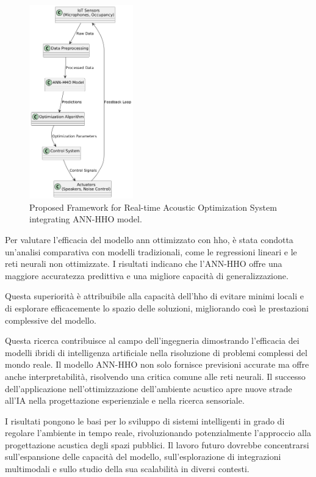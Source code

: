 \begin{figure}[H]
      \centering
      \includegraphics[width=0.4\textwidth]{Chapters/Figures/real_time_system.png}
      \caption{\small Proposed Framework for Real-time Acoustic Optimization System integrating ANN-HHO model.}
      \label{fig:realtimesystem}
\end{figure}

Per valutare l'efficacia del modello \gls{ann} ottimizzato con \gls{hho}, è stata condotta un'analisi comparativa con modelli tradizionali, come le regressioni lineari e le reti neurali non ottimizzate. I risultati indicano che l'ANN-HHO offre una maggiore accuratezza predittiva e una migliore capacità di generalizzazione.

Questa superiorità è attribuibile alla capacità dell'\gls{hho} di evitare minimi locali e di esplorare efficacemente lo spazio delle soluzioni, migliorando così le prestazioni complessive del modello. \cite{8030298}

Questa ricerca contribuisce al campo dell'ingegneria dimostrando l'efficacia dei modelli ibridi di intelligenza artificiale nella risoluzione di problemi complessi del mondo reale. Il modello ANN-HHO non solo fornisce previsioni accurate ma offre anche interpretabilità, risolvendo una critica comune alle reti neurali. Il successo dell'applicazione nell'ottimizzazione dell'ambiente acustico apre nuove strade all'IA nella progettazione esperienziale e nella ricerca sensoriale.

I risultati pongono le basi per lo sviluppo di sistemi intelligenti in grado di regolare l'ambiente in tempo reale, rivoluzionando potenzialmente l'approccio alla progettazione acustica degli spazi pubblici. Il lavoro futuro dovrebbe concentrarsi sull'espansione delle capacità del modello, sull'esplorazione di integrazioni multimodali e sullo studio della sua scalabilità in diversi contesti.

